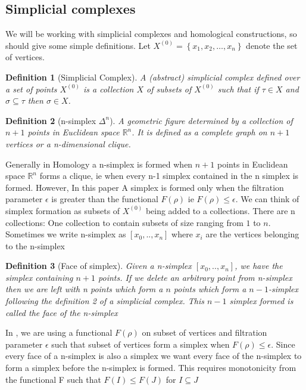 \documentclass{article}
\newtheorem{definition}{Definition}
\newcommand{\set}[1]{\left\{ #1 \right\}}
\begin{document}
\subsection{Simplicial complexes} \label{sec:simplicial_defs}

We will be working with simplicial complexes and homological constructions, so should give some simple definitions. Let $X^{(0)} = \set{x_1, x_2, \ldots, x_n}$ denote the set of vertices.  
\begin{definition}[Simplicial Complex] \label{def:simplicial_complex}
    A (abstract) simplicial complex defined over a set of points $X^{(0)}$ is a collection $X$ of subsets of $X^{(0)}$ such that if $\tau \in X$ and $\sigma \subseteq \tau$ then $\sigma \in X$. 
\end{definition}

\begin{definition}[n-simplex $\Delta ^ n$] \label{def:n-simplex}
    A geometric figure determined by a collection of $n + 1$ points in Euclidean space $\mathbb{R}^n$. It is defined as a complete graph on $n+1$ vertices or a n-dimensional clique.
\end{definition}

Generally in Homology a n-simplex is formed when $n + 1$ points in Euclidean space $\mathbb{R}^n$ forms a clique, ie when every n-1 simplex contained in the n simplex is formed. However, In this paper \cite{hamilton2023probing} A simplex is formed only when the filtration parameter $\epsilon$ is greater than the functional $F(\rho)$ ie $F(\rho) \leq \epsilon$. We can think of simplex formation as subsets of  $X^{(0)}$ being added to a collections. There are n collections: One collection to contain subsets of size ranging from $1$ to $n$. Sometimes we write n-simplex as $[x_0, .., x_n]$ where $x_i$ are the vertices belonging to the n-simplex

\begin{definition}[Face of simplex] \label{def:n-simplex}
    Given a n-simplex $[x_0, .., x_n]$, we have the simplex containing $n+1$ points. If we delete an arbitrary point from n-simplex then we are left with n points which form a $n$ points which form a $n-1$-simplex following the definition 2 of a simplicial complex. This $n-1$ simplex formed is called the face of the n-simplex
\end{definition}

In \cite{hamilton2023probing}, we are using a functional $F(\rho)$ on subset of vertices and filtration parameter $\epsilon$ such that subset of vertices form a simplex when $F(\rho) \leq \epsilon$. Since every face of a n-simplex is also a simplex we want every face of the n-simplex to form a simplex before the n-simplex is formed. This requires monotonicity from the functional F such that $F(I) \leq F(J) $ for $I \subseteq J$  
\end{document}
